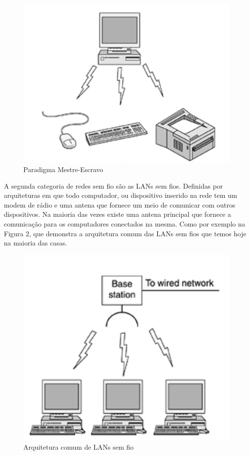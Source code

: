\documentclass[12pt, %
openright, 
oneside,
a4paper,
brazil]{facom-ufu-abntex2}
\begin{document}
\begin{figure}[hbt]
  \includegraphics[scale=0.9]{bt}
  \caption{Paradigma Mestre-Escravo \cite{tanenbaum2003redes}}
\end{figure}

A segunda categoria de redes sem fio são as LANs sem fios. Definidas por arquiteturas em que todo computador, ou dispositivo inserido na rede tem um modem de rádio e uma antena que fornece um meio de comunicar com outros dispositivos. Na maioria das vezes existe uma antena principal que fornece a comunicação para os computadores conectados na mesma. Como por exemplo na Figura 2, que demonstra a arquitetura comum das LANs sem fios que temos hoje na maioria das casas.

\begin{figure}[hbt]
  \includegraphics[scale=0.9]{lan} 
  \caption{Arquitetura comum de LANs sem fio \cite{tanenbaum2003redes}}
\end{figure}
\end{document}
